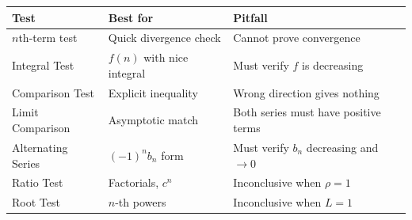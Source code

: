 \begin{keyformula}[title={Master convergence test summary (exam reference)}]
\begin{center}
\renewcommand{\arraystretch}{1.4}
\begin{tabular}{@{}p{3.8cm}p{4.2cm}p{4.8cm}@{}}
\textbf{Test} & \textbf{Best for} & \textbf{Pitfall} \\
\hline
$n$th-term test & Quick divergence check & Cannot prove convergence \\
Integral Test & $f(n)$ with nice integral & Must verify $f$ is decreasing \\
Comparison Test & Explicit inequality & Wrong direction gives nothing \\
Limit Comparison & Asymptotic match & Both series must have positive terms \\
Alternating Series & $(-1)^n b_n$ form & Must verify $b_n$ decreasing and $\to 0$ \\
Ratio Test & Factorials, $c^n$ & Inconclusive when $\rho=1$ \\
Root Test & $n$-th powers & Inconclusive when $L=1$ \\
\end{tabular}
\end{center}
\end{keyformula}

